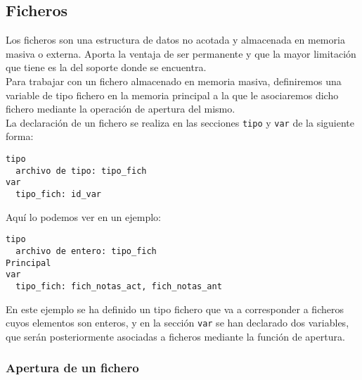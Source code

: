 \documentclass[12pt,letterpaper]{article}
\begin{document}
\subsection{Ficheros}

Los ficheros son una estructura de datos no acotada y almacenada en memoria masiva o externa. Aporta la ventaja de ser permanente y que la mayor limitación que tiene es la del soporte donde se encuentra.\\
Para trabajar con un fichero almacenado en memoria masiva, definiremos una variable de tipo fichero en la memoria principal a la que le asociaremos dicho fichero mediante la operación de apertura del mismo.\\
La declaración de un fichero se realiza en las secciones \texttt{tipo} y \texttt{var} de la siguiente forma:
\begin{lstlisting}
tipo
  archivo de tipo: tipo_fich
var
  tipo_fich: id_var
\end{lstlisting}
Aquí lo podemos ver en un ejemplo:
\begin{lstlisting}
tipo
  archivo de entero: tipo_fich
Principal
var
  tipo_fich: fich_notas_act, fich_notas_ant
\end{lstlisting}
En este ejemplo se ha definido un tipo fichero que va a corresponder a ficheros cuyos elementos son enteros, y en la sección \texttt{var} se han declarado dos variables, que serán posteriormente asociadas a ficheros mediante la función de apertura.

\subsubsection{Apertura de un fichero}
\end{document}
